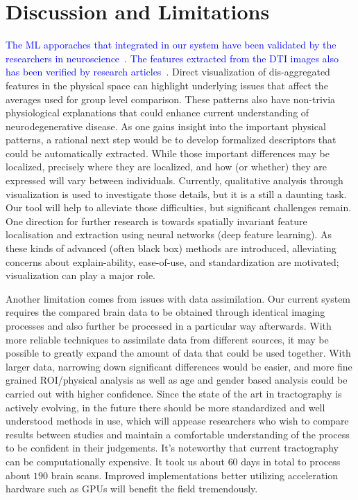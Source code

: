 \section{Discussion and Limitations}

\noindent \textcolor{blue}{The ML apporaches that integrated in our system have been validated by the researchers in neuroscience~\cite{mateos2018structural,tanveer2020machine}. The features extracted from the DTI images also has been verified by research articles~\cite{acosta2016whole, wen2016white}.} Direct visualization of dis-aggregated features in the physical space can highlight underlying issues that affect the averages used for group level comparison. These patterns also have non-trivia physiological explanations that could enhance current understanding of neurodegenerative disease. As one gains insight into the important physical patterns, a rational next step would be to develop formalized descriptors that could be automatically extracted. While those important differences may be localized, precisely where they are localized, and how (or whether) they are expressed will vary between individuals. Currently, qualitative analysis through visualization is used to investigate those details, but it is a still a daunting task. Our tool will help to alleviate those difficulties, but significant challenges remain. One direction for further research is towards spatially invariant feature localisation and extraction using  neural networks (deep feature learning). As these kinds of advanced (often black box) methods are introduced, alleviating concerns about explain-ability, ease-of-use, and standardization are motivated; visualization can play a major role.

Another limitation comes from issues with data assimilation. Our current system requires the compared brain data to be obtained through identical imaging processes and also further be processed in a particular way afterwards. With more reliable techniques to assimilate data from different sources, it may be possible to greatly expand the amount of data that could be used together. With larger data, narrowing down significant differences would be easier, and more fine grained ROI/physical analysis as well as age and gender based analysis could be carried out with higher confidence. Since the state of the art in tractography is actively evolving, in the future there should be more standardized and well understood methods in use, which will appease researchers who wish to compare results between studies and maintain a comfortable understanding of the process to be confident in their judgements. 
It's noteworthy that 
current tractography can be computationally expensive. It took us about $60$ days in total to process about $190$ brain scans. Improved implementations better utilizing acceleration hardware such as GPUs will benefit the field tremendously. 


